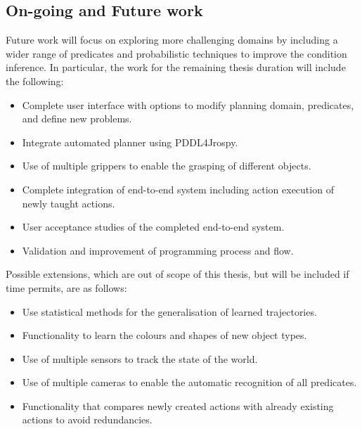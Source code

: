 \subsection{On-going and Future work}
Future work will focus on exploring more challenging domains by including a wider range of predicates and probabilistic techniques to improve the condition inference.
In particular, the work for the remaining thesis duration will include the following:
\begin{itemize}
\item Complete user interface with options to modify planning domain, predicates, and define new problems.
\item Integrate automated planner using PDDL4Jrospy.
\item Use of multiple grippers to enable the grasping of different objects.
\item Complete integration of end-to-end system including action execution of newly taught actions.
\item User acceptance studies of the completed end-to-end system.
\item Validation and improvement of programming process and flow.
\end{itemize}

Possible extensions, which are out of scope of this thesis, but will be included if time permits, are as follows:
\begin{itemize}
	\item Use statistical methods for the generalisation of learned trajectories.
	\item Functionality to learn the colours and shapes of new object types.
	\item Use of multiple sensors to track the state of the world.
	\item Use of multiple cameras to enable the automatic recognition of all predicates.
	\item Functionality that compares newly created actions with already existing actions to avoid redundancies.
\end{itemize}